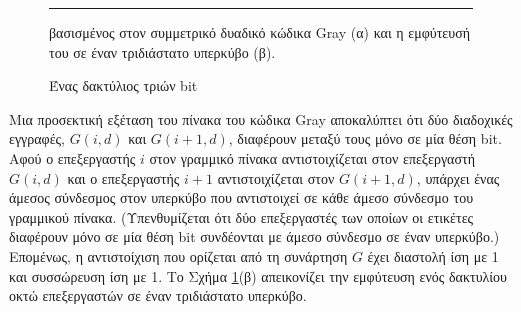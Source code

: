 \documentclass[12pt,a4paper]{article} %
\begin{document}
\begin{figure}[H]
\noindent\rule{\textwidth}{0.2pt}
\caption{Ένας δακτύλιος τριών bit} βασισμένος 
στον συμμετρικό δυαδικό κώδικα Gray (α) και 
η εμφύτευσή του σε έναν τριδιάστατο υπερκύβο (β).
\label{fig:graph49}
\end{figure}
\vspace{0.3cm}

Μια προσεκτική εξέταση του πίνακα του κώδικα Gray
αποκαλύπτει ότι δύο διαδοχικές εγγραφές, $G(i,d)$ και $G(i+1,d)$, διαφέρουν 
μεταξύ τους μόνο σε μία θέση bit. Αφού ο 
επεξεργαστής $i$ στον γραμμικό πίνακα αντιστοιχίζεται στον επεξεργαστή 
$G(i,d)$ και ο επεξεργαστής $i+1$ αντιστοιχίζεται στον $G(i+1,d)$, υπάρχει 
ένας άμεσος σύνδεσμος στον υπερκύβο που αντιστοιχεί σε κάθε άμεσο 
σύνδεσμο του γραμμικού πίνακα. (Υπενθυμίζεται ότι δύο επεξεργαστές 
των οποίων οι ετικέτες διαφέρουν μόνο σε μία θέση bit
συνδέονται με άμεσο σύνδεσμο σε έναν υπερκύβο.) Επομένως, η αντιστοίχιση 
που ορίζεται από τη συνάρτηση $G$ έχει διαστολή ίση με 1 και συσσώρευση 
ίση με 1. Το Σχήμα \ref{fig:graph49}(β) απεικονίζει την εμφύτευση ενός 
δακτυλίου οκτώ επεξεργαστών σε έναν τριδιάστατο υπερκύβο.
\end{document}

